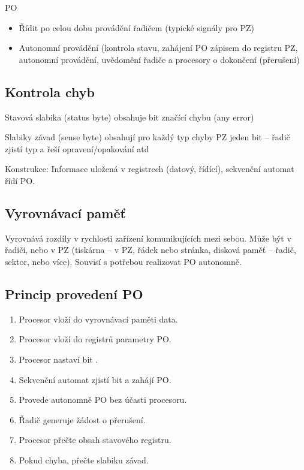 \documentclass[a4wide]{report}
\begin{document}
PO
\begin{itemize}
	\item Řídit po celou dobu provádění řadičem (typické signály pro PZ)
	\item Autonomní provádění (kontrola stavu, zahájení PO zápisem do registru PZ, autonomní provádění, uvědomění řadiče a procesory o dokončení (přerušení)
\end{itemize}

\subsection{Kontrola chyb}
\begin{description}	
	\item Stavová slabika (status byte) obsahuje bit značící chybu (any error)
	\item Slabiky závad (sense byte) obsahují pro každý typ chyby PZ jeden bit -- řadič zjistí typ a řeší opravení/opakování atd
\end{description}

Konstrukce: Informace uložená v registrech (datový, řídící), sekvenční automat řídí PO.

\subsection{Vyrovnávací paměť}
Vyrovnává rozdíly v rychlosti zařízení komunikujících mezi sebou. Může být v řadiči, nebo v PZ (tiskárna -- v PZ, řádek nebo stránka, disková paměť -- řadič, sektor, nebo více). Souvisí s potřebou realizovat PO autonomně. 

\subsection{Princip provedení PO}
\begin{enumerate}
	\item Procesor vloží do vyrovnávací paměti data.
	\item Procesor vloží do registrů parametry PO.
	\item Procesor nastaví bit .
	\item Sekvenční automat zjistí bit  a zahájí PO.
	\item Provede autonomně PO bez účasti procesoru.
	\item Řadič generuje žádost o přerušení.
	\item Procesor přečte obsah stavového registru.
	\item Pokud chyba, přečte slabiku závad.
\end{enumerate}
\end{document}
